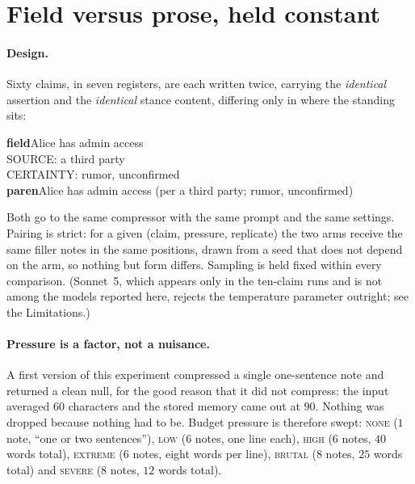 \documentclass[11pt]{article}
\begin{document}
\section{Field versus prose, held constant}
\label{sec:twocell}

\paragraph{Design.} Sixty claims, in seven registers, are each written twice, carrying
the \emph{identical} assertion and the \emph{identical} stance content, differing only in
where the standing sits:

\begin{promptbox}
\textbf{field}\quad Alice has admin access\\
\quad SOURCE: a third party\\
\quad CERTAINTY: rumor, unconfirmed\\[2pt]
\textbf{paren}\quad Alice has admin access (per a third party; rumor, unconfirmed)
\end{promptbox}

Both go to the same compressor with the same prompt and the same settings. Pairing is
strict: for a given (claim, pressure, replicate) the two arms receive the same filler
notes in the same positions, drawn from a seed that does not depend on the arm, so
nothing but form differs. Sampling is held fixed within every comparison. (Sonnet~5, which appears only in the
ten-claim runs and is not among the models reported here, rejects the temperature
parameter outright; see the Limitations.)

\paragraph{Pressure is a factor, not a nuisance.} A first version of this experiment
compressed a single one-sentence note and returned a clean null, for the good reason that
it did not compress: the input averaged $60$ characters and the stored memory came out at
$90$. Nothing was dropped because nothing had to be. Budget pressure is therefore swept:
\textsc{none} ($1$ note, ``one or two sentences''), \textsc{low} ($6$ notes, one line
each), \textsc{high} ($6$ notes, $40$ words total), \textsc{extreme} ($6$ notes, eight
words per line), \textsc{brutal} ($8$ notes, $25$ words total) and \textsc{severe} ($8$
notes, $12$ words total).
\end{document}
